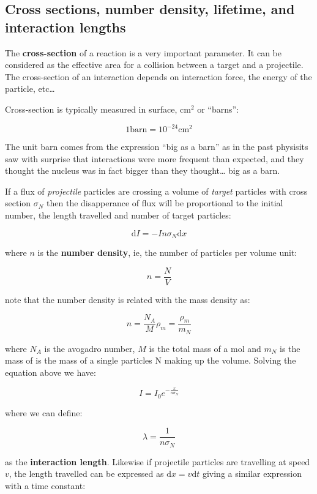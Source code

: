 \documentclass[
  letterpaper,
  DIV=11,
  numbers=noendperiod]{scrreprt}
\begin{document}
\subsection*{Cross sections, number density, lifetime, and interaction
lengths}\label{cross-sections-number-density-lifetime-and-interaction-lengths}

The \textbf{cross-section} of a reaction is a very important parameter.
It can be considered as the effective area for a collision between a
target and a projectile. The cross-section of an interaction depends on
interaction force, the energy of the particle, etc\ldots{}

Cross-section is typically measured in surface, cm\(^2\) or ``barns'':

\[ 1 \mathrm{ barn} = 10^{-24} \mathrm{ cm}^2\]

The unit barn comes from the expression ``big as a barn'' as in the past
physisits saw with surprise that interactions were more frequent than
expected, and they thought the nucleus was in fact bigger than they
thought\ldots{} big as a barn.

If a flux of \emph{projectile} particles are crossing a volume of
\emph{target} particles with cross section \(\sigma_N\) then the
disapperance of flux will be proportional to the initial number, the
length travelled and number of target particles:

\[ \mathrm{ d} I = -I n \sigma_N \mathrm{ d} x \]

where \(n\) is the \textbf{number density}, ie, the number of particles
per volume unit:

\[ n = \frac{N}{V} \]

note that the number density is related with the mass density as:

\[n = \frac{N_A}{M} \rho_m = \frac{\rho_m}{m_N}\]

where \(N_A\) is the avogadro number, \(M\) is the total mass of a mol
and \(m_N\) is the mass of is the mass of a single particles N making up
the volume. Solving the equation above we have:

\[I = I_0 e^{-\frac{x}{n\sigma_N}}\]

where we can define:

\[\lambda = \frac{1}{n\sigma_N}\]

as the \textbf{interaction length}. Likewise if projectile particles are
travelling at speed \(v\), the length travelled can be expressed as
\(\mathrm{ d}x = v \mathrm{ d} t\) giving a similar expression with a
time constant:
\end{document}
